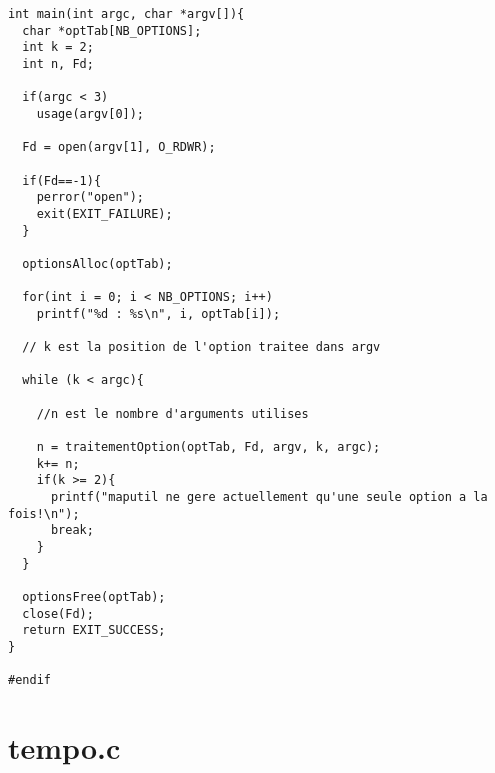 \documentclass{report}
\begin{document}
\begin{lstlisting}
int main(int argc, char *argv[]){
  char *optTab[NB_OPTIONS];
  int k = 2;
  int n, Fd;
  
  if(argc < 3)
    usage(argv[0]);

  Fd = open(argv[1], O_RDWR);
  
  if(Fd==-1){
    perror("open");
    exit(EXIT_FAILURE);
  }
  
  optionsAlloc(optTab);

  for(int i = 0; i < NB_OPTIONS; i++)
    printf("%d : %s\n", i, optTab[i]);

  // k est la position de l'option traitee dans argv
  
  while (k < argc){
  
    //n est le nombre d'arguments utilises
  
    n = traitementOption(optTab, Fd, argv, k, argc);
    k+= n;
    if(k >= 2){
	  printf("maputil ne gere actuellement qu'une seule option a la fois!\n");
	  break;
	}
  }
  
  optionsFree(optTab);
  close(Fd);
  return EXIT_SUCCESS;
}

#endif
  \end{lstlisting}

\chapter{tempo.c}
\end{document}
